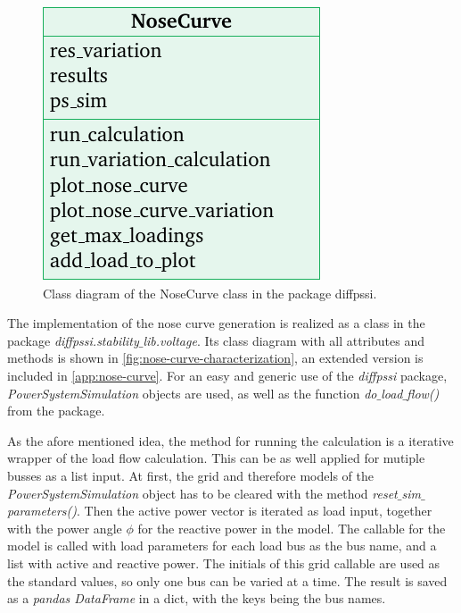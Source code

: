 \begin{figure}
        \centering
        \includegraphics[width=.9\linewidth]{tikz_graphics/images/class_diagram_nosecurve_red.pdf}
        \caption[Class diagram of the NoseCurve class in the package diffpssi]{Class diagram of the NoseCurve class in the package diffpssi.}
        \label{fig:nose-curve-characterization}
\end{figure}
The implementation of the nose curve generation is realized as a class in the package {\itshape diffpssi.stability$\_$lib.voltage}.
Its class diagram with all attributes and methods is shown in \autoref{fig:nose-curve-characterization}, an extended version is included in \autoref{app:nose-curve}.
For an easy and generic use of the {\itshape diffpssi} package, {\itshape PowerSystemSimulation} objects are used, as well as the function {\itshape do$\_$load$\_$flow()} from the package.

As the afore mentioned idea, the method for running the calculation is a iterative wrapper of the load flow calculation. 
This can be as well applied for mutiple busses as a list input.
At first, the grid and therefore models of the {\itshape PowerSystemSimulation} object has to be cleared with the method {\itshape reset$\_$sim$\_$parameters()}.
Then the active power vector is iterated as load input, together with the power angle $\phi$ for the reactive power in the model.
The callable for the model is called with load parameters for each load bus as the bus name, and a list with active and reactive power.
The initials of this grid callable are used as the standard values, so only one bus can be varied at a time.
The result is saved as a {\itshape pandas DataFrame} in a dict, with the keys being the bus names.

